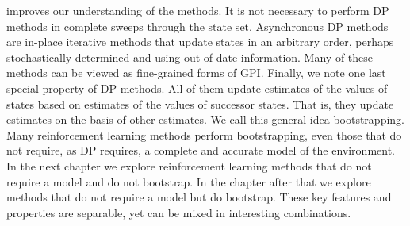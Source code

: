 improves our understanding of the methods.
It is not necessary to perform DP methods in complete sweeps through the state
set. Asynchronous DP methods are in-place iterative methods that update states in an
arbitrary order, perhaps stochastically determined and using out-of-date information.
Many of these methods can be viewed as fine-grained forms of GPI.
Finally, we note one last special property of DP methods. All of them update estimates
of the values of states based on estimates of the values of successor states. That is, they
update estimates on the basis of other estimates. We call this general idea bootstrapping.
Many reinforcement learning methods perform bootstrapping, even those that do not
require, as DP requires, a complete and accurate model of the environment. In the next
chapter we explore reinforcement learning methods that do not require a model and do
not bootstrap. In the chapter after that we explore methods that do not require a model
but do bootstrap. These key features and properties are separable, yet can be mixed in
interesting combinations.
